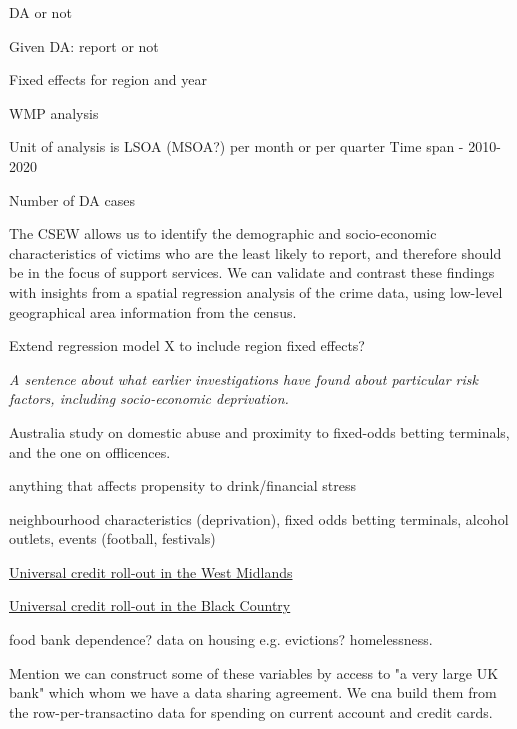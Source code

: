 \documentclass[11pt, a4paper]{article}
\begin{document}
DA or not ~

Given DA: report or not ~

Fixed effects for region and year



WMP analysis

Unit of analysis is LSOA (MSOA?) per month or per quarter
Time span - 2010-2020

Number of DA cases ~ 

The CSEW allows us to identify the demographic and socio-economic characteristics of victims who are the least likely to report, and therefore should be in the focus of support services. We can validate and contrast these findings with insights from a spatial regression analysis of the crime data, using low-level geographical area information from the census. 

Extend regression model X to include region fixed effects?


\textit{A sentence about what earlier investigations have found about particular risk factors, including socio-economic deprivation.} 

Australia study on domestic abuse and proximity to fixed-odds betting terminals, and the one on offlicences.

anything that affects propensity to drink/financial stress

neighbourhood characteristics (deprivation), fixed odds betting terminals, alcohol outlets, events (football, festivals)

\href{https://www.birminghammail.co.uk/news/midlands-news/universal-credit-rolled-out-across-14142901}{Universal credit roll-out in the West Midlands}

\href{https://www.birminghammail.co.uk/black-country/universal-credit-claimants-black-country-15946831}{Universal credit roll-out in the Black Country}


food bank dependence? data on housing e.g. evictions? homelessness.

Mention we can construct some of these variables by access to "a very large UK bank" which whom we have a data sharing agreement. We cna build them from the row-per-transactino data for spending on current account and credit cards.

\newpage



\end{document}
